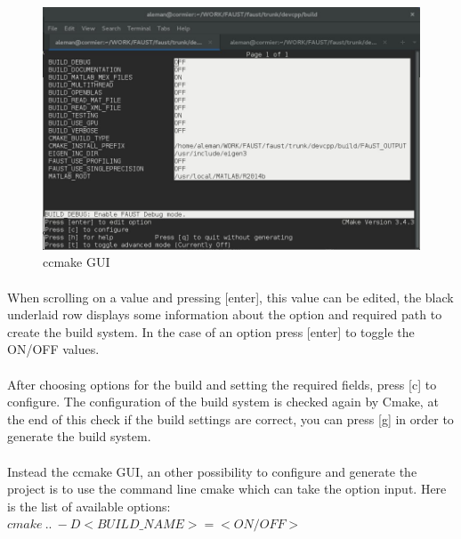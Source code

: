 \begin{figure}[!h] %
\label{fig:ccmake}
\centering
\includegraphics[scale=0.5]{images/ccmake.jpg}
\caption{ccmake GUI}
\end{figure}

\paragraph{}When scrolling on a value and pressing [enter], this value can be edited, the black underlaid row displays some information about the option and required path to create the build system. In the case of an option press [enter] to toggle the ON/OFF values.
\paragraph{}After choosing options for the build and setting the required fields, press [c] to configure. The configuration of the build system is checked again by Cmake, at the end of this check if the build settings are correct, you can press [g] in order to generate the build system.
	

\paragraph{} Instead the ccmake GUI, an other possibility to configure and generate the project is to use the command line cmake which can take the option input. Here is the list of available options: 
\texttt{$cmake\ ..\ -D<BUILD\_NAME>=<ON/OFF>$}

